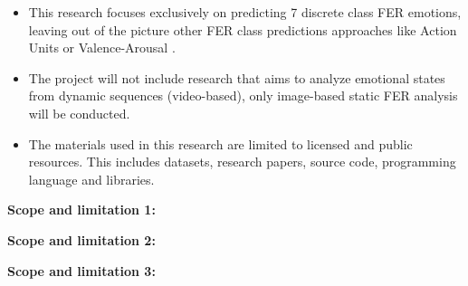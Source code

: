 \begin{itemize}
\item This research focuses exclusively on predicting 7 discrete class FER emotions, leaving out of the picture other FER class predictions approaches like Action Units or Valence-Arousal \citep{kollias_affect_2021}.

\item The project will not include research that aims to analyze emotional states from dynamic sequences (video-based)\cite{wang_survey_2024}, only image-based static FER analysis will be conducted. 

\item The materials used in this research are limited to licensed and public resources. This includes datasets, research papers, source code, programming language and libraries. 
\end{itemize}

\textbf{Scope and limitation 1:} 

\textbf{Scope and limitation 2:}
 
\textbf{Scope and limitation 3:} 